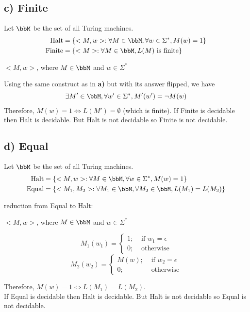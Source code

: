 \documentclass[twoside,11pt]{homework}
\begin{document}
\subsection*{c) Finite}
  Let $\bbM$ be the set of all Turing machines. \\
  \[
    \begin{aligned}
      \text{Halt} &= \{ <M, w>: \forall M \in \bbM, \forall w \in \Sigma^*, M(w) = 1\}\\
      \text{Finite} &= \{ <M> : \forall M \in \bbM, L(M) \text{ is finite} \}
    \end{aligned}
  \]
  \begin{given}
    $<M ,w>$, where $M \in \bbM$ and $w \in \Sigma^*$
  \end{given}
  Using the same construct as in \textbf{a)} but with its answer flipped, we have\\
  \[
    \exists M' \in \bbM, \forall w' \in \Sigma^*, M'(w') = \lnot M(w)
  \]
  Therefore, $M(w) = 1 \iff L(M') = \emptyset$ (which is finite).
  If Finite is decidable then Halt is decidable.
  But Halt is not decidable so Finite is not decidable.

\subsection*{d) Equal}
  Let $\bbM$ be the set of all Turing machines. \\
  \[
    \begin{aligned}
      \text{Halt} &= \{ <M, w>: \forall M \in \bbM, \forall w \in \Sigma^*, M(w) = 1\}\\
      \text{Equal} &= \{ <M_1, M_2> : \forall M_1 \in \bbM, \forall M_2 \in \bbM, L(M_1)=L(M_2) \}
    \end{aligned}
  \]

  reduction from Equal to Halt:
  \begin{given}
    $<M ,w>$, where $M \in \bbM$ and $w \in \Sigma^*$
  \end{given}
  \begin{construct}
    \[
      M_1(w_1) =
      \left\{
        \begin{aligned}
          1 ; &\text{ if } w_1 = \epsilon\\
          0 ; &\text{ otherwise}
        \end{aligned}
      \right.
    \]
    \[
      M_2(w_2) =
      \left\{
        \begin{aligned}
          M(w) ;& \text{ if } w_2 = \epsilon\\
          0 ;& \text{ otherwise}
        \end{aligned}
      \right.
    \]
  \end{construct}
  Therefore, $M(w) = 1 \iff L(M_1) = L(M_2)$.\\
  If Equal is decidable then Halt is decidable.
  But Halt is not decidable so Equal is not decidable.
\end{document}
